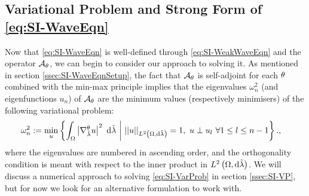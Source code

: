 \subsection{Variational Problem and Strong Form of \eqref{eq:SI-WaveEqn}} \label{ssec:SI-Derivation}
Now that \eqref{eq:SI-WaveEqn} is well-defined through \eqref{eq:SI-WeakWaveEqn} and the operator $\mathcal{A}_{\theta}$, we can begin to consider our approach to solving it.
As mentioned in section \ref{ssec:SI-WaveEqnSetup}, the fact that $\mathcal{A}_{\theta}$ is self-adjoint for each $\theta$ combined with the min-max principle implies that the eigenvalues $\omega_{n}^2$ (and eigenfunctions $u_n$) of $\mathcal{A}_{\theta}$ are the minimum values (respectively minimisers) of the following variational problem:
\begin{align} \label{eq:SI-VarProb}
	\omega_n^2 &:= \min_{u}\left\{  \int_{\Omega} \left\lvert \nabla^{\theta}_{\tilde{\lambda}}u \right\rvert^2  \ \mathrm{d}\tilde{\lambda} \ \middle\vert \  \lvert\lvert u \rvert\rvert_{L^{2}\left( \Omega,\mathrm{d}\tilde{\lambda} \right)}=1, \ u\perp u_l \ \forall 1\leq l\leq n-1  \right\}.,
\end{align} 
where the eigenvalues are numbered in ascending order, and the orthogonality condition is meant with respect to the inner product in $L^{2}\left( \Omega,\mathrm{d}\tilde{\lambda} \right)$.
We will discuss a numerical approach to solving \eqref{eq:SI-VarProb} in section \ref{ssec:SI-VP}, but for now we look for an alternative formulation to work with.

